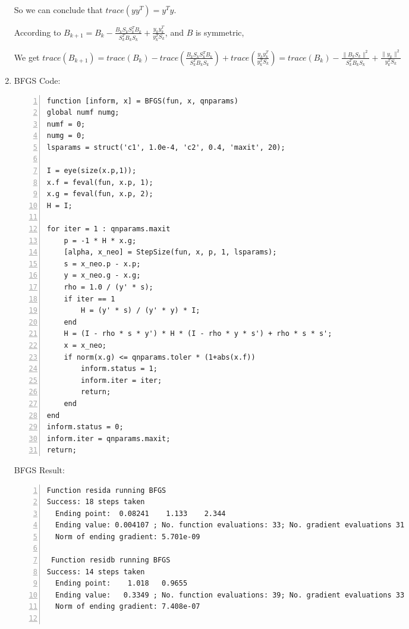 \documentclass[12pt]{article}
\begin{document}
\begin{enumerate}
So we can conclude that $trace(yy^T) = y^Ty$.

According to $B_{k+1} = B_k - \frac{B_k S_k S_k^T B_k}{S_k^T B_k S_k} + \frac{y_ky_k^T}{y_k^TS_k}$, and $B$ is symmetric,

We get $trace(B_{k+1}) = trace(B_k)  - trace(\frac{B_k S_k S_k^T B_k}{S_k^T B_k S_k}) + trace(\frac{y_ky_k^T}{y_k^TS_k}) = trace(B_k)  - \frac{\|B_k S_k\|^2}{S_k^T B_k S_k} + \frac{\|y_k\|^2}{y_k^TS_k}$

\clearpage

\item

BFGS Code:

\begin{lstlisting}[language={[ANSI]C}, numbers=left, numberstyle=\tiny, frame=shadowbox, basicstyle=\ttfamily\small, showspaces=false, breaklines=true, showstringspaces=false, showtabs=false]
function [inform, x] = BFGS(fun, x, qnparams)
global numf numg;
numf = 0;
numg = 0;
lsparams = struct('c1', 1.0e-4, 'c2', 0.4, 'maxit', 20);

I = eye(size(x.p,1));
x.f = feval(fun, x.p, 1);
x.g = feval(fun, x.p, 2);
H = I;

for iter = 1 : qnparams.maxit
    p = -1 * H * x.g;
    [alpha, x_neo] = StepSize(fun, x, p, 1, lsparams);
    s = x_neo.p - x.p;
    y = x_neo.g - x.g;
    rho = 1.0 / (y' * s);
    if iter == 1
        H = (y' * s) / (y' * y) * I;
    end
    H = (I - rho * s * y') * H * (I - rho * y * s') + rho * s * s';
    x = x_neo;
    if norm(x.g) <= qnparams.toler * (1+abs(x.f))
        inform.status = 1;
        inform.iter = iter;
        return;
    end
end
inform.status = 0;
inform.iter = qnparams.maxit;
return;
\end{lstlisting}

\bigskip

BFGS Result:

\begin{lstlisting}[language={[ANSI]C}, numbers=left, numberstyle=\tiny, frame=shadowbox, basicstyle=\ttfamily\small, showspaces=false, breaklines=true, showstringspaces=false, showtabs=false]
 Function resida running BFGS
Success: 18 steps taken
  Ending point:  0.08241    1.133    2.344
  Ending value: 0.004107 ; No. function evaluations: 33; No. gradient evaluations 31
  Norm of ending gradient: 5.701e-09

 Function residb running BFGS
Success: 14 steps taken
  Ending point:    1.018   0.9655
  Ending value:   0.3349 ; No. function evaluations: 39; No. gradient evaluations 33
  Norm of ending gradient: 7.408e-07


\end{lstlisting}
\end{enumerate}
\end{document}
